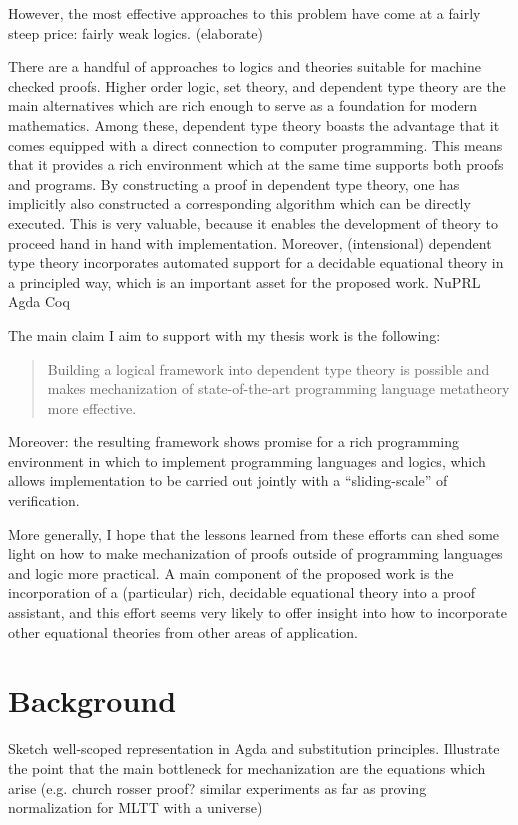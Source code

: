 \documentclass{article}
\begin{document}
However, the most effective approaches to this problem have
come at a fairly steep price: fairly weak logics. (elaborate)

There are a handful of approaches to logics and theories suitable for
machine checked proofs. Higher order logic, set theory, and dependent
type theory are the main alternatives which are rich enough to serve
as a foundation for modern mathematics. Among these, dependent type theory
\citep{Martin-Loef73a} boasts the advantage that it comes equipped with a direct
connection to computer programming. This means that it provides a rich
environment which at the same time supports both proofs and
programs. By constructing a proof in dependent type theory, one has
implicitly also constructed a corresponding algorithm which can be
directly executed. This is very valuable, because it
enables the development of theory to proceed hand in hand
with implementation. Moreover, (intensional) dependent type theory
incorporates automated support for a decidable equational theory in a
principled way, which is an important asset for the proposed work.
NuPRL \citep{NuPRL} Agda \citep{Norell:phd07} Coq
\citep{bertot/casteran:2004}

The main claim I aim to support with my thesis work is the following:

\begin{quote}Building a logical framework into dependent type
theory is possible and makes mechanization of state-of-the-art programming
language metatheory more effective.
\end{quote}

Moreover: the resulting framework shows promise for a rich programming
environment in which to implement programming languages and logics, which allows
implementation to be carried out jointly with a ``sliding-scale'' of
verification.

More generally, I hope that the lessons learned from these efforts can shed some light on how
to make mechanization of proofs outside of programming languages and
logic more practical. A main component of the proposed work is the
incorporation of a (particular) rich, decidable equational theory into a
proof assistant, and this effort seems very likely to offer insight into how to
incorporate other equational theories from other areas of application.


\section{Background}
Sketch well-scoped representation in Agda and substitution
principles. Illustrate the point that the main bottleneck for
mechanization are the equations which arise (e.g. church rosser proof?
similar experiments as far as proving normalization for MLTT with a universe)
\end{document}
